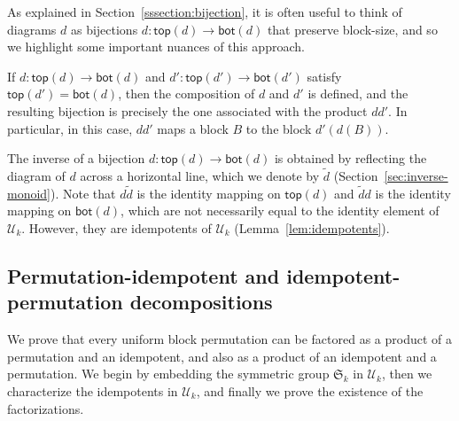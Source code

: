 \begin{remark}
    \label{remark:composition-and-product}
    As explained in Section~\ref{sssection:bijection},
    it is often useful to think of diagrams $d$ as bijections
    $d : \mathsf{top}(d) \to \mathsf{bot}(d)$ that preserve block-size,
    and so we highlight some important nuances of this approach.

    If $d : \mathsf{top}(d) \to \mathsf{bot}(d)$
    and $d' : \mathsf{top}(d') \to \mathsf{bot}(d')$
    satisfy $\mathsf{top}(d') = \mathsf{bot}(d)$,
    then the composition of $d$ and $d'$ is defined,
    and the resulting bijection is precisely the one
    associated with the product $d d'$.
    In particular, in this case, $d d'$ maps a block $B$ to the block $d'(d(B))$.

    The inverse of a bijection $d : \mathsf{top}(d) \to \mathsf{bot}(d)$
    is obtained by reflecting the diagram of $d$ across a horizontal line,
    which we denote by $\widetilde{d}$ (\cf Section~\ref{sec:inverse-monoid}).
    Note that $d \widetilde{d}$ is the identity mapping on $\mathsf{top}(d)$
    and $\widetilde{d} d $ is the identity mapping on $\mathsf{bot}(d)$,
    which are not necessarily equal to the identity element of $\mathcal{U}_k$.
    However, they are idempotents of $\mathcal{U}_k$ (\cf Lemma~\ref{lem:idempotents}).
\end{remark}

\subsection{Permutation-idempotent and idempotent-permutation decompositions}
\label{section.factorizable}

We prove that every uniform block permutation
can be factored as a product of a permutation and an idempotent,
and also as a product of an idempotent and a permutation.
We begin by embedding the symmetric group $\mathfrak{S}_k$ in $\mathcal{U}_k$,
then we characterize the idempotents in $\mathcal{U}_k$,
and finally we prove the existence of the factorizations.

